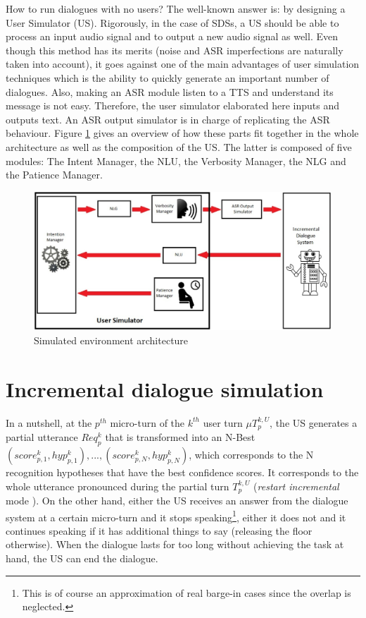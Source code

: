 	How to run dialogues with no users? The well-known answer is: by designing a User Simulator (US). Rigorously, in the case of SDSs, a US should be able to process an input audio signal and to output a new audio signal as well. Even though this method has its merits (noise and ASR imperfections are naturally taken into account), it goes against one of the main advantages of user simulation techniques which is the ability to quickly generate an important number of dialogues. Also, making an ASR module listen to a TTS and understand its message is not easy. Therefore, the user simulator elaborated here inputs and outputs text. An ASR output simulator is in charge of replicating the ASR behaviour. Figure \ref{fig:simuoverview} gives an overview of how these parts fit together in the whole architecture as well as the composition of the US. The latter is composed of five modules: The Intent Manager, the NLU, the Verbosity Manager, the NLG and the Patience Manager.
	
		\begin{figure}[htb]
			\centering
			\includegraphics[scale=0.45]{figures/SimuSys.jpg}
			\caption{Simulated environment architecture}
			\label{fig:simuoverview}
		\end{figure}
    
\section{Incremental dialogue simulation}
				
				In a nutshell, at the $p^{th}$ micro-turn of the $k^{th}$ user turn $\mu T^{k,U}_p$, the US generates a partial utterance $Req^k_p$ that is transformed into an N-Best ${(score^k_{p,1}, hyp^k_{p,1}),...,(score^k_{p,N}, hyp^k_{p,N})}$, which corresponds to the N recognition hypotheses that have the best confidence scores. It corresponds to the whole utterance pronounced during the partial turn $T^{k,U}_p$ (\textit{restart incremental} mode \cite{Schlangen2011}). On the other hand, either the US receives an answer from the dialogue system at a certain micro-turn and it stops speaking\footnote{This is of course an approximation of real barge-in cases since the overlap is neglected.}, either it does not and it continues speaking if it has additional things to say (releasing the floor otherwise). When the dialogue lasts for too long without achieving the task at hand, the US can end the dialogue.

